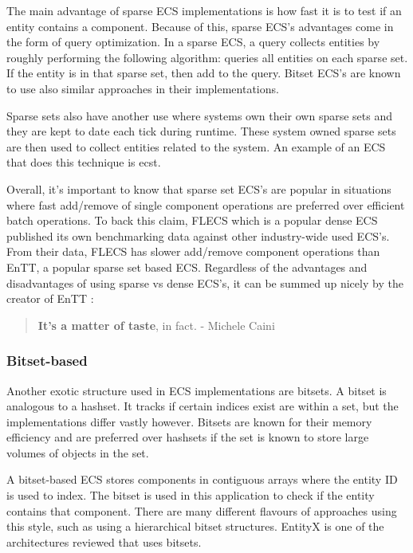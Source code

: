 The main advantage of sparse ECS implementations is how fast it is to test if an entity contains a component. Because of this, sparse ECS's advantages come in the form of query optimization. In a sparse ECS, a query collects entities by roughly performing the following algorithm: queries all entities on each sparse set. If the entity is in that sparse set, then add to the query. Bitset ECS's are known to use also similar approaches in their implementations.\cite{EnTT_SparseSets}

Sparse sets also have another use where systems own their own sparse sets and they are kept to date each tick during runtime. These system owned sparse sets are then used to collect entities related to the system. An example of an ECS that does this technique is ecst. \cite{ecst}

Overall, it's important to know that sparse set ECS's are popular in situations where fast add/remove of single component operations are preferred over efficient batch operations. To back this claim, FLECS which is a popular dense ECS published its own benchmarking data against other industry-wide used ECS's. From their data, FLECS has slower add/remove component operations than EnTT, a popular sparse set based ECS.\cite{FLECS_EnTTCompare} Regardless of the advantages and disadvantages of using sparse vs dense ECS's, it can be summed up nicely by the creator of EnTT \cite{EnTT_archetype_and_quote}:

\begin{quote}
    \textbf{It’s a matter of taste}, in fact.
        - Michele Caini
\end{quote}

\subsubsection{Bitset-based}
Another exotic structure used in ECS implementations are bitsets. A bitset is analogous to a hashset. It tracks if certain indices exist are within a set, but the implementations differ vastly however. Bitsets are known for their memory efficiency and are preferred over hashsets if the set is known to store large volumes of objects in the set. \cite{Sutherland2014}

A bitset-based ECS stores components in contiguous arrays where the entity ID is used to index. The bitset is used in this application to check if the entity contains that component. There are many different flavours of approaches using this style, such as using a hierarchical bitset structures. \cite{SanderMertensFAQ} EntityX is one of the architectures reviewed that uses bitsets.


